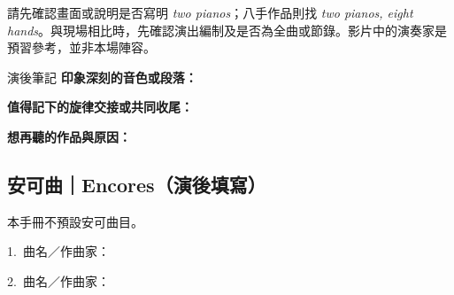 \documentclass[UTF8,12pt,a4paper,fontset=none]{ctexart}
\begin{document}
請先確認畫面或說明是否寫明 \textit{two pianos}；八手作品則找 \textit{two pianos, eight hands}。與現場相比時，先確認演出編制及是否為全曲或節錄。影片中的演奏家是預習參考，並非本場陣容。

\begin{listen}{演後筆記}
\textbf{印象深刻的音色或段落：}\par\vspace{0.3cm}
\hrulefill\par
\textbf{值得記下的旋律交接或共同收尾：}\par\vspace{0.3cm}
\hrulefill\par
\textbf{想再聽的作品與原因：}\par\vspace{0.3cm}
\hrulefill
\end{listen}
\subsection{安可曲｜Encores（演後填寫）}
本手冊不預設安可曲目。\par
1.\ 曲名／作曲家：\hrulefill\par\vspace{0.2cm}
2.\ 曲名／作曲家：\hrulefill
\clearpage
\end{document}
